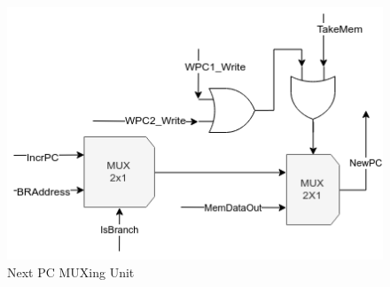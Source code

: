 \documentclass[12pt]{article}
\theoremstyle{plain}
\theoremstyle{definition}
\begin{document}
\begin{figure}
    \centering
    \includegraphics[]{Diagrams/fetch_predecode_npc.png}
    \caption{Next PC MUXing Unit}
    \label{fetch-predecode-npc}
\end{figure}
\end{document}
